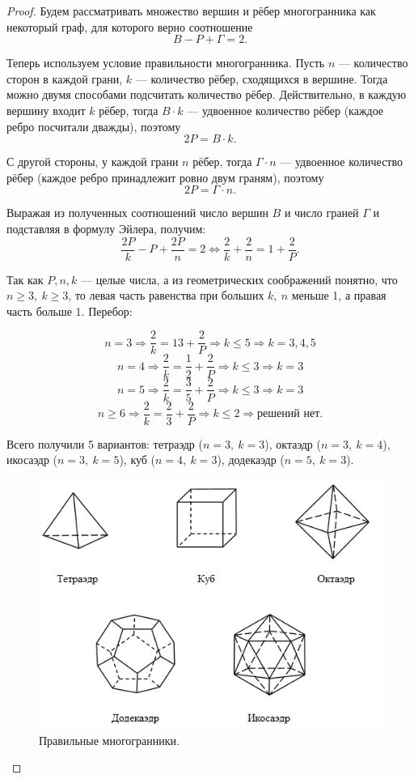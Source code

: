 \begin{proof}
    Будем рассматривать множество вершин и рёбер многогранника как некоторый граф, для которого верно соотношение \[B - P + \Gamma = 2.\]

    Теперь используем условие правильности многогранника. Пусть $n$ — количество сторон в каждой грани, $k$ — количество рёбер, сходящихся в вершине. Тогда можно двумя способами подсчитать количество рёбер. Действительно, в каждую вершину входит $k$ рёбер, тогда $B \cdot k$ — удвоенное количество рёбер (каждое ребро посчитали дважды), поэтому \[2P = B \cdot k.\]
    
    С другой стороны, у каждой грани $n$ рёбер, тогда $\Gamma \cdot n$ — удвоенное количество рёбер (каждое ребро принадлежит ровно двум граням), поэтому \[2P = \Gamma \cdot n.\]

    Выражая из полученных соотношений число вершин $B$ и число граней $\Gamma$ и подставляя в формулу Эйлера, получим:
    \[\frac{2P}{k} - P + \frac{2P}{n} = 2 \Longleftrightarrow \frac{2}{k} + \frac{2}{n} = 1 + \frac{2}{P}.\]

    Так как $P,n,k$ — целые числа, а из геометрических соображений понятно, что $n \geq 3, \ k \geq 3$, то левая часть равенства при больших $k, \ n$ меньше 1, а правая часть больше 1. Перебор:

    \[n = 3 \Longrightarrow \frac{2}{k} = {1}{3} + \frac{2}{P} \Longrightarrow k \leq 5 \Longrightarrow k = 3,4,5\]
    \[n = 4 \Longrightarrow \frac{2}{k} = \frac{1}{2} + \frac{2}{P} \Longrightarrow k \leq 3 \Longrightarrow k = 3\]
    \[n = 5 \Longrightarrow \frac{2}{k} = \frac{3}{5} + \frac{2}{P} \Longrightarrow k \leq 3 \Longrightarrow k = 3\]
    \[n \geq 6 \Longrightarrow \frac{2}{k} = \frac{2}{3} + \frac{2}{P} \Longrightarrow k \leq 2 \Longrightarrow \text{решений нет}.\]

    Всего получили 5 вариантов: тетраэдр ($n = 3, \ k = 3$), октаэдр ($n = 3, \ k = 4$), икосаэдр ($n = 3, \ k = 5$), куб ($n = 4, \ k = 3$), додекаэдр ($n = 5, \ k = 3$).

    \begin{figure}[h]
        \centering
        \includegraphics[scale=0.8]{images/c7.5.png}
        \caption{Правильные многогранники.}
        \label{fig:c7.5}
    \end{figure}




\end{proof}
